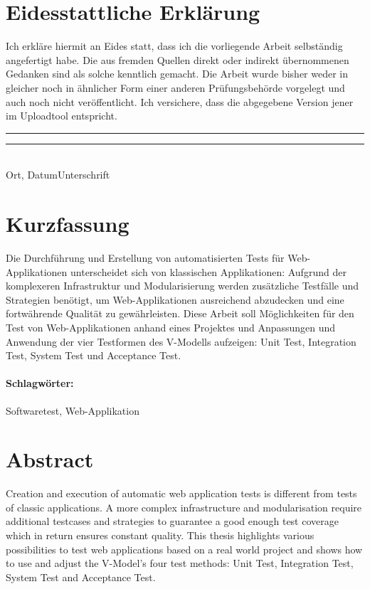 \documentclass[a4paper,bibtotoc,oneside]{scrbook}
\begin{document}
\newpage


\section*{Eidesstattliche Erklärung}\thispagestyle{empty}
\glqq Ich erkläre hiermit an Eides statt, dass ich die vorliegende Arbeit selbständig angefertigt habe.
Die aus fremden Quellen direkt oder indirekt übernommenen Gedanken sind als solche kenntlich gemacht.
Die Arbeit wurde bisher weder in gleicher noch in ähnlicher Form einer anderen Prüfungsbehörde vorgelegt
und auch noch nicht veröffentlicht. Ich versichere, dass die abgegebene Version jener im Uploadtool entspricht.\grqq\\[5\baselineskip]
\rule{5cm}{0.2pt}\hfill\rule{5cm}{0.2pt}\\
\phantom{Datum }Ort, Datum\hfill Unterschrift\hspace{15mm}

\newpage


\section*{Kurzfassung}\thispagestyle{empty}
Die Durchführung und Erstellung von automatisierten Tests für Web-Applikationen unterscheidet sich von klassischen Applikationen: Aufgrund der komplexeren Infrastruktur und Modularisierung werden zusätzliche Testfälle und Strategien benötigt, um Web-Applikationen ausreichend abzudecken und eine fortwährende Qualität zu gewährleisten. Diese Arbeit soll Möglichkeiten für den Test von Web-Applikationen anhand eines Projektes und Anpassungen und Anwendung der vier Testformen des V-Modells aufzeigen: Unit Test, Integration Test, System Test und Acceptance Test.

\vfill
\paragraph*{Schlagwörter:} Softwaretest, Web-Applikation

\newpage

\section*{Abstract}\thispagestyle{empty}
Creation and execution of automatic web application tests is different from tests of classic applications. A more complex infrastructure and modularisation require additional testcases and strategies to guarantee a good enough test coverage which in return ensures constant quality. This thesis highlights various possibilities to test web applications based on a real world project and shows how to use and adjust the V-Model's four test methods: Unit Test, Integration Test, System Test and Acceptance Test.
\end{document}
